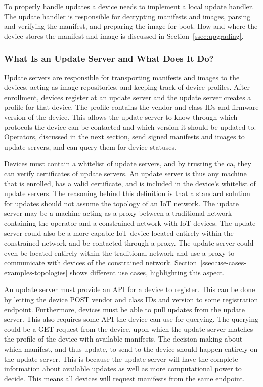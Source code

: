 \documentclass[0-thesis.tex]{subfiles}
\begin{document}
To properly handle updates a device needs to implement a local update handler. The update
handler is responsible for decrypting manifests and images, parsing and verifying the
manifest, and preparing the image for boot. How and where the device stores the manifest
and image is discussed in Section~\ref{ssec:upgrading}.

\subsubsection{What Is an Update Server and What Does It Do?}
\label{sssec:what-is-an-update-server}
Update servers are responsible for transporting manifests and images to the devices,
acting as image repositories, and keeping track of device profiles. After enrollment,
devices register at an update server and the update server creates a profile for that
device. The profile contains the vendor and class IDs and firmware version of the device.
This allows the update server to know through which protocols the device can be contacted
and which version it should be updated to. Operators, discussed in the next section, send
signed manifests and images to update servers, and can query them for device statuses.

Devices must contain a whitelist of update servers, and by trusting the \gls{ca}, they can
verify certificates of update servers. An update server is thus any machine that is
enrolled, has a valid certificate, and is included in the device's whitelist of update
servers. The reasoning behind this definition is that a standard solution for updates
should not assume the topology of an IoT network. The update server may be a machine
acting as a proxy between a traditional network containing the operator and a constrained
network with IoT devices. The update server could also be a more capable IoT device
located entirely within the constrained network and be contacted through a proxy. The
update server could even be located entirely within the traditional network and use a
proxy to communicate with devices of the constrained network.
Section~\ref{ssec:use-cases-examples-topologies} shows different use cases, highlighting
this aspect.

An update server must provide an API for a device to register. This can be done by letting
the device POST vendor and class IDs and version to some registration endpoint.
Furthermore, devices must be able to pull updates from the update server. This also
requires some API the device can use for querying. The querying could be a GET request
from the device, upon which the update server matches the profile of the device with
available manifests. The decision making about which manifest, and thus update, to send to
the device should happen entirely on the update server. This is because the update server
will have the complete information about available updates as well as more computational
power to decide. This means all devices will request manifests from the same endpoint.
\end{document}
